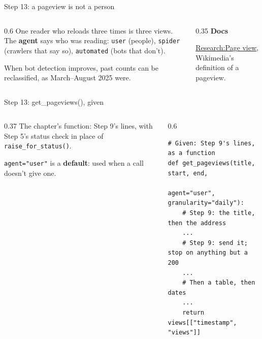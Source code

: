 \documentclass[9pt,aspectratio=169]{beamer}
\begin{document}
\begin{frame}{Step 13: a pageview is not a person}
    \begin{columns}[T]
        \begin{column}{0.6\textwidth}
            One reader who reloads three times is three views. The \textbf{agent} says who was reading: \texttt{user} (people), \texttt{spider} (crawlers that say so), \texttt{automated} (bots that don't).

            \medskip
            When bot detection improves, past counts can be reclassified, as March--August 2025 were.
        \end{column}
        \begin{column}{0.35\textwidth}
            \textbf{Docs}\\[2pt]
            {\footnotesize \href{https://meta.wikimedia.org/wiki/Research:Page_view}{Research:Page view}, Wikimedia's definition of a pageview.\par}
        \end{column}
    \end{columns}
\end{frame}

\begin{frame}[fragile]{Step 13: get\_pageviews(), given}
    \begin{columns}[T]
        \begin{column}{0.37\textwidth}
            The chapter's function: Step 9's lines, with Step 5's status check in place of \texttt{raise\_for\_status()}.

            \medskip
            \texttt{agent="user"} is a \textbf{default}: used when a call doesn't give one.
        \end{column}
        \begin{column}{0.6\textwidth}
\begin{lstlisting}
# Given: Step 9's lines, as a function
def get_pageviews(title, start, end,
                  agent="user", granularity="daily"):
    # Step 9: the title, then the address
    ...
    # Step 9: send it; stop on anything but a 200
    ...
    # Then a table, then dates
    ...
    return views[["timestamp", "views"]]
\end{lstlisting}
        \end{column}
    \end{columns}
\end{frame}
\end{document}
